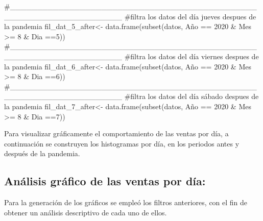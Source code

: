 \documentclass[
  us-letterpaper,
]{scrreprt}
\newenvironment{Shaded}{\begin{snugshade}}{\end{snugshade}}
\newcommand{\CommentTok}[1]{\textcolor[rgb]{0.37,0.37,0.37}{#1}}
\newcommand{\DecValTok}[1]{\textcolor[rgb]{0.68,0.00,0.00}{#1}}
\newcommand{\FunctionTok}[1]{\textcolor[rgb]{0.28,0.35,0.67}{#1}}
\newcommand{\NormalTok}[1]{\textcolor[rgb]{0.00,0.23,0.31}{#1}}
\newcommand{\OtherTok}[1]{\textcolor[rgb]{0.00,0.23,0.31}{#1}}
\newcommand{\SpecialCharTok}[1]{\textcolor[rgb]{0.37,0.37,0.37}{#1}}
\theoremstyle{plain}
\theoremstyle{plain}
\theoremstyle{definition}
\theoremstyle{remark}
\begin{document}
\begin{Shaded}
\begin{Highlighting}[]
\CommentTok{\#\_\_\_\_\_\_\_\_\_\_\_\_\_\_\_\_\_\_\_\_\_\_\_\_\_\_\_\_\_\_\_\_\_\_\_\_\_\_\_\_\_\_\_\_\_\_\_\_\_\_\_\_\_\_\_\_\_\_\_\_\_\_\_\_\_\_\_\_}
\CommentTok{\#filtra los datos del día jueves despues de la pandemia}
\NormalTok{fil\_dat\_5\_after}\OtherTok{\textless{}{-}} \FunctionTok{data.frame}\NormalTok{(}\FunctionTok{subset}\NormalTok{(datos,}
\NormalTok{                                    Año }\SpecialCharTok{==} \DecValTok{2020} \SpecialCharTok{\&}\NormalTok{ Mes }\SpecialCharTok{\textgreater{}=} \DecValTok{8} \SpecialCharTok{\&}\NormalTok{ Dia }\SpecialCharTok{==}\DecValTok{5}\NormalTok{))}
\CommentTok{\#\_\_\_\_\_\_\_\_\_\_\_\_\_\_\_\_\_\_\_\_\_\_\_\_\_\_\_\_\_\_\_\_\_\_\_\_\_\_\_\_\_\_\_\_\_\_\_\_\_\_\_\_\_\_\_\_\_\_\_\_\_\_\_\_\_\_\_\_}
\CommentTok{\#filtra los datos del día viernes despues de la pandemia}
\NormalTok{fil\_dat\_6\_after}\OtherTok{\textless{}{-}} \FunctionTok{data.frame}\NormalTok{(}\FunctionTok{subset}\NormalTok{(datos,}
\NormalTok{                                    Año }\SpecialCharTok{==} \DecValTok{2020} \SpecialCharTok{\&}\NormalTok{ Mes }\SpecialCharTok{\textgreater{}=} \DecValTok{8} \SpecialCharTok{\&}\NormalTok{ Dia }\SpecialCharTok{==}\DecValTok{6}\NormalTok{))}
\CommentTok{\#\_\_\_\_\_\_\_\_\_\_\_\_\_\_\_\_\_\_\_\_\_\_\_\_\_\_\_\_\_\_\_\_\_\_\_\_\_\_\_\_\_\_\_\_\_\_\_\_\_\_\_\_\_\_\_\_\_\_\_\_\_\_\_\_\_\_\_\_}
\CommentTok{\#filtra los datos del día sábado despues de la pandemia}
\NormalTok{fil\_dat\_7\_after}\OtherTok{\textless{}{-}} \FunctionTok{data.frame}\NormalTok{(}\FunctionTok{subset}\NormalTok{(datos,}
\NormalTok{                                    Año }\SpecialCharTok{==} \DecValTok{2020} \SpecialCharTok{\&}\NormalTok{ Mes }\SpecialCharTok{\textgreater{}=} \DecValTok{8} \SpecialCharTok{\&}\NormalTok{ Dia }\SpecialCharTok{==}\DecValTok{7}\NormalTok{))}
\end{Highlighting}
\end{Shaded}

Para visualizar gráficamente el comportamiento de las ventas por día, a
continuación se construyen los histogramas por día, en los periodos
antes y después de la pandemia.

\subsection{Análisis gráfico de las ventas por
día:}\label{anuxe1lisis-gruxe1fico-de-las-ventas-por-duxeda}

Para la generación de los gráficos se empleó los filtros anteriores, con
el fin de obtener un análisis descriptivo de cada uno de ellos.
\end{document}
